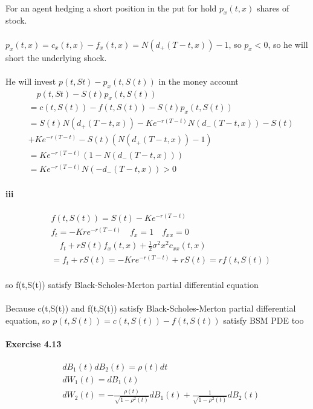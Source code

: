 \documentclass{article}
\begin{document}
\paragraph{}{For an agent hedging a short position in the put for hold $p_x(t,x)$ shares of stock.}
\paragraph{}{$p_x(t,x)=c_x(t,x)-f_x(t,x)=N(d_+(T-t,x))-1$, so $p_x < 0$, so he will short the underlying shock.}
\paragraph{}{He will invest $p(t,St)-p_x(t,S(t))$ in the money account}
\begin{align*}
  &\quad p(t,St)-S(t)p_x(t,S(t)) \\
  &=c(t,S(t))-f(t,S(t))-S(t)p_x(t,S(t))\\
  &=S(t)N(d_+(T-t,x))-Ke^{-r(T-t)}N(d_-(T-t,x))-S(t)\\
  &+Ke^{-r(T-t)}-S(t)(N(d_+(T-t,x))-1)\\
  &=Ke^{-r(T-t)}(1-N(d_-(T-t,x)))\\
  &=Ke^{-r(T-t)}N(-d_-(T-t,x))>0
\end{align*}
\paragraph{iii}
\begin{align*}
&f(t,S(t))=S(t)-Ke^{-r(T-t)}\\
  &f_t= -Kre^{-r(T-t)}\quad f_x=1 \quad f_{xx}=0 \\
  &\quad f_t+rS(t)f_x(t,x)+\frac{1}{2}\sigma^2x^2c_{xx}(t,x)\\
 & =f_t+rS(t)=-Kre^{-r(T-t)}+rS(t)=rf(t,S(t))
\end{align*}
\paragraph{}{so f(t,S(t)) satisfy Black-Scholes-Merton partial differential equation }
\paragraph{}{ Because c(t,S(t)) and f(t,S(t)) satisfy Black-Scholes-Merton partial differential equation, so $p(t,S(t))=c(t,S(t))-f(t,S(t))$ satisfy BSM PDE too}
\paragraph{Exercise 4.13}
\begin{align*}
   & dB_1(t)dB_2(t)=\rho(t)dt \\
  &dW_1(t)= dB_1(t)\\
   & dW_2(t)=-\frac{\rho(t)}{\sqrt{1-\rho^2(t)}}dB_1(t)+\frac{1}{\sqrt{1-\rho^2(t)}}dB_2(t)
\end{align*}
\end{document}
